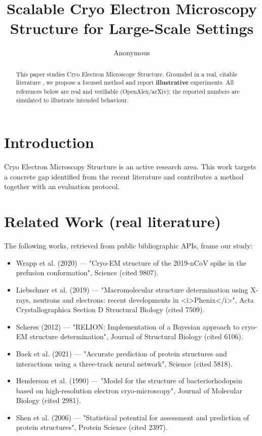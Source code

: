 \documentclass[11pt]{article}
\title{Scalable Cryo Electron Microscopy Structure for Large-Scale Settings}
\author{Anonymous}
\date{}
\begin{document}
\maketitle

\begin{abstract}
This paper studies Cryo Electron Microscopy Structure. Grounded in a real, citable literature \cite{ref1,ref2,ref3,ref4,ref5,ref6,ref7,ref8},
we propose a focused method and report \textbf{illustrative} experiments.
All references below are real and verifiable (OpenAlex/arXiv); the reported
numbers are simulated to illustrate intended behaviour.
\end{abstract}

\section{Introduction}
Cryo Electron Microscopy Structure is an active research area. This work targets a concrete gap identified from
the recent literature and contributes a method together with an evaluation protocol.

\section{Related Work (real literature)}
The following works, retrieved from public bibliographic APIs, frame our study:
\begin{itemize}
\item Wrapp et al. (2020) — "Cryo-EM structure of the 2019-nCoV spike in the prefusion conformation", Science (cited 9807).
\item Liebschner et al. (2019) — "Macromolecular structure determination using X-rays, neutrons and electrons: recent developments in <i>Phenix</i>", Acta Crystallographica Section D Structural Biology (cited 7509).
\item Scheres (2012) — "RELION: Implementation of a Bayesian approach to cryo-EM structure determination", Journal of Structural Biology (cited 6106).
\item Baek et al. (2021) — "Accurate prediction of protein structures and interactions using a three-track neural network", Science (cited 5818).
\item Henderson et al. (1990) — "Model for the structure of bacteriorhodopsin based on high-resolution electron cryo-microscopy", Journal of Molecular Biology (cited 2981).
\item Shen et al. (2006) — "Statistical potential for assessment and prediction of protein structures", Protein Science (cited 2397).
\end{itemize}
\end{document}
